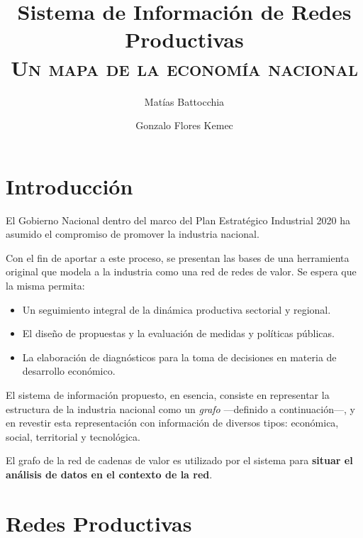 \documentclass[a4paper]{report}
\begin{document}
\title{Sistema de Información de Redes Productivas\\\textsc{Un mapa de la economía nacional}}
\author{Matías Battocchia}
\author{Gonzalo Flores Kemec}

\maketitle

\section*{Introducción}

El Gobierno Nacional dentro del marco del Plan Estratégico Industrial 2020 ha asumido el compromiso de promover la industria nacional. 

Con el fin de aportar a este proceso, se presentan las bases de una herramienta original que modela a la industria como una red de redes de valor. Se espera que la misma permita:

\begin{itemize}
  \item Un seguimiento integral de la dinámica productiva sectorial y regional.
  \item El diseño de propuestas y la evaluación de medidas y políticas públicas.
  \item La elaboración de diagnósticos para la toma de decisiones en materia de desarrollo económico.
\end{itemize}

El sistema de información propuesto, en esencia, consiste en representar la estructura de la industria nacional como un \textit{grafo} —definido a continuación—, y en revestir esta representación con información de diversos tipos: económica, social, territorial y tecnológica. 

El grafo de la red de cadenas de valor es utilizado por el sistema para \textbf{situar el análisis de datos en el contexto de la red}. 


\section*{Redes Productivas}
\end{document}
